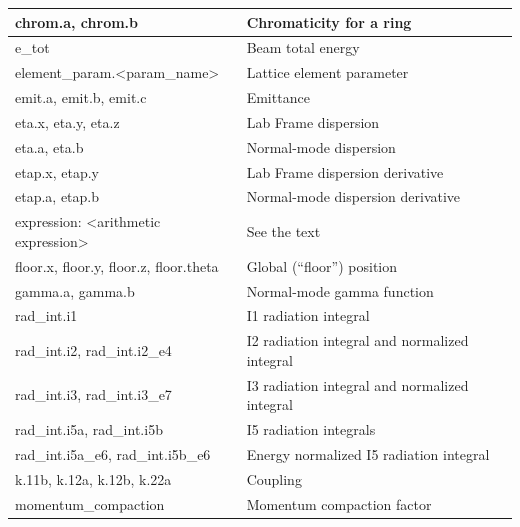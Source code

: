 \begin{table}[ht]
{\begin{tabular}{|l|l|}
  chrom.a, chrom.b               & Chromaticity for a ring            \\ \hline

  e\_tot                         & Beam total energy                  \\ \hline

  element\_param.<param\_name>   & Lattice element parameter          \\ \hline

  emit.a, emit.b, emit.c         & Emittance                          \\ \hline

  eta.x, eta.y, eta.z            & Lab Frame dispersion               \\ \hline 
  eta.a, eta.b                   & Normal-mode dispersion             \\ \hline 
  etap.x, etap.y                 & Lab Frame dispersion derivative    \\ \hline 
  etap.a, etap.b                 & Normal-mode dispersion derivative  \\ \hline 

  expression: <arithmetic expression>
                                 & See the text                       \\ \hline 

  floor.x, floor.y, floor.z, floor.theta 
                                 & Global (``floor'') position        \\ \hline 

  gamma.a, gamma.b               & Normal-mode gamma function         \\ \hline 

  rad\_int.i1                    & I1 radiation integral              \\ \hline
  rad\_int.i2, rad\_int.i2\_e4   & I2 radiation integral and normalized integral \\ \hline
  rad\_int.i3, rad\_int.i3\_e7   & I3 radiation integral and normalized integral \\ \hline
  rad\_int.i5a, rad\_int.i5b     & I5 radiation integrals                        \\ \hline
  rad\_int.i5a\_e6, rad\_int.i5b\_e6 & Energy normalized I5 radiation integral   \\ \hline

  k.11b, k.12a, k.12b, k.22a     & Coupling                           \\ \hline 
  momentum\_compaction           & Momentum compaction factor         \\ \hline


\end{tabular}}
\end{table}
